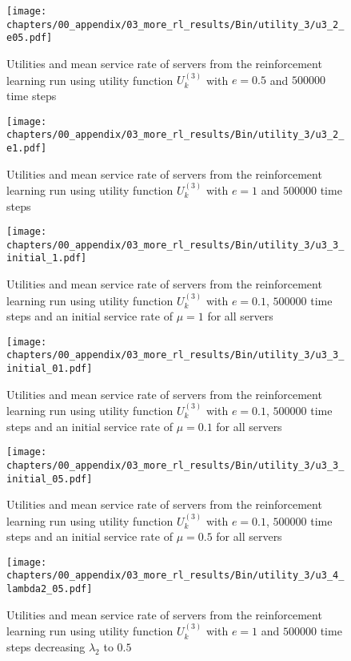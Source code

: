 \begin{figure}[H]
    \texttt{[image: chapters/00\_appendix/03\_more\_rl\_results/Bin/utility\_3/u3\_2\_e05.pdf]}
    \caption{Utilities and mean service rate of servers from the reinforcement
    learning run using utility function \(U_k^{(3)}\) with \(e = 0.5\) and
    \(500000\) time steps}
    \label{fig:RL_utility3_2_e05}
\end{figure}

\begin{figure}[H]
    \texttt{[image: chapters/00\_appendix/03\_more\_rl\_results/Bin/utility\_3/u3\_2\_e1.pdf]}
    \caption{Utilities and mean service rate of servers from the reinforcement
    learning run using utility function \(U_k^{(3)}\) with \(e = 1\) and
    \(500000\) time steps}
    \label{fig:RL_utility3_2_e1}
\end{figure}

\begin{figure}[H]
    \texttt{[image: chapters/00\_appendix/03\_more\_rl\_results/Bin/utility\_3/u3\_3\_initial\_1.pdf]}
    \caption{Utilities and mean service rate of servers from the reinforcement
    learning run using utility function \(U_k^{(3)}\) with \(e = 0.1\),
    \(500000\) time steps and an initial service rate of \(\mu = 1\) for all
    servers}
    \label{fig:RL_utility3_3_initial_1}
\end{figure}

\begin{figure}[H]
    \texttt{[image: chapters/00\_appendix/03\_more\_rl\_results/Bin/utility\_3/u3\_3\_initial\_01.pdf]}
    \caption{Utilities and mean service rate of servers from the reinforcement
    learning run using utility function \(U_k^{(3)}\) with \(e = 0.1\),
    \(500000\) time steps and an initial service rate of \(\mu = 0.1\) for all
    servers}
    \label{fig:RL_utility3_3_initial_01}
\end{figure}

\begin{figure}[H]
    \texttt{[image: chapters/00\_appendix/03\_more\_rl\_results/Bin/utility\_3/u3\_3\_initial\_05.pdf]}
    \caption{Utilities and mean service rate of servers from the reinforcement
    learning run using utility function \(U_k^{(3)}\) with \(e = 0.1\),
    \(500000\) time steps and an initial service rate of \(\mu = 0.5\) for all
    servers}
    \label{fig:RL_utility3_3_initial_05}
\end{figure}

\begin{figure}[H]
    \texttt{[image: chapters/00\_appendix/03\_more\_rl\_results/Bin/utility\_3/u3\_4\_lambda2\_05.pdf]}
    \caption{Utilities and mean service rate of servers from the reinforcement
    learning run using utility function \(U_k^{(3)}\) with \(e = 1\) and
    \(500000\) time steps decreasing \(\lambda_2\) to \(0.5\)}
    \label{fig:RL_utility3_4_lambda2_05}
\end{figure}


